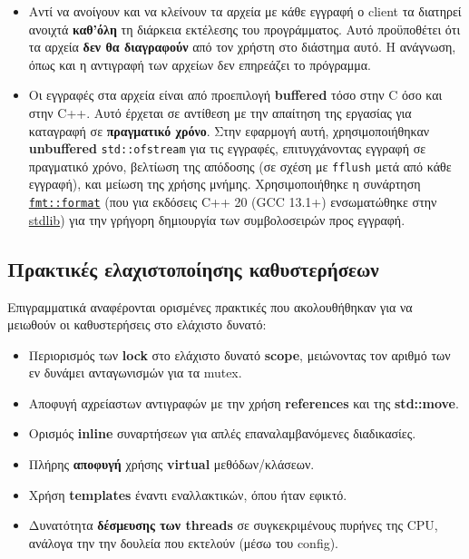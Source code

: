 \documentclass[12pt]{article}
\begin{document}
\begin{itemize}
    \item Αντί να ανοίγουν και να κλείνουν τα αρχεία με κάθε εγγραφή ο client τα διατηρεί ανοιχτά \textbf{καθ'όλη} τη διάρκεια εκτέλεσης του προγράμματος. Αυτό προϋποθέτει ότι τα αρχεία \textbf{δεν θα διαγραφούν} από τον χρήστη στο διάστημα αυτό. Η ανάγνωση, όπως και η αντιγραφή των αρχείων δεν επηρεάζει το πρόγραμμα.
    \item Οι εγγραφές στα αρχεία είναι από προεπιλογή \textbf{buffered} τόσο στην C όσο και στην C++. Αυτό έρχεται σε αντίθεση με την απαίτηση της εργασίας για καταγραφή σε \textbf{πραγματικό χρόνο}. Στην εφαρμογή αυτή, χρησιμοποιήθηκαν \textbf{unbuffered} \texttt{std::ofstream} για τις εγγραφές, επιτυγχάνοντας εγγραφή σε πραγματικό χρόνο, βελτίωση της απόδοσης (σε σχέση με \texttt{fflush} μετά από κάθε εγγραφή), και μείωση της χρήσης μνήμης. Χρησιμοποιήθηκε η συνάρτηση \href{https://fmt.dev/11.0/api/#format-api}{\texttt{fmt::format}} (που για εκδόσεις C++ 20 (GCC 13.1+) ενσωματώθηκε στην \href{https://en.cppreference.com/w/cpp/utility/format/format}{stdlib}) για την γρήγορη δημιουργία των συμβολοσειρών προς εγγραφή.
\end{itemize}

\subsection{Πρακτικές ελαχιστοποίησης καθυστερήσεων}
Επιγραμματικά αναφέρονται ορισμένες πρακτικές που ακολουθήθηκαν για να μειωθούν οι καθυστερήσεις στο ελάχιστο δυνατό:
\begin{itemize}
    \item Περιορισμός των \textbf{lock} στο ελάχιστο δυνατό \textbf{scope}, μειώνοντας τον αριθμό των εν δυνάμει ανταγωνισμών για τα mutex.
    \item Αποφυγή αχρείαστων αντιγραφών με την χρήση \textbf{references} και της \textbf{std::move}.
    \item Ορισμός \textbf{inline} συναρτήσεων για απλές επαναλαμβανόμενες διαδικασίες.
    \item Πλήρης \textbf{αποφυγή} χρήσης \textbf{virtual} μεθόδων/κλάσεων.
    \item Χρήση \textbf{templates} έναντι εναλλακτικών, όπου ήταν εφικτό.
    \item Δυνατότητα \textbf{δέσμευσης των threads} σε συγκεκριμένους πυρήνες της CPU, ανάλογα την την δουλεία που εκτελούν (μέσω του config).
\end{itemize}
\end{document}
